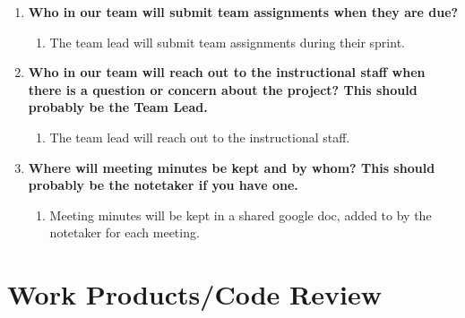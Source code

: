 \documentclass[12pt]{article}
\begin{document}
\begin{enumerate}
    \item \textbf{Who in our team will submit team assignments when they are due?}
    \begin{enumerate}
        \item The team lead will submit team assignments during their sprint.
    \end{enumerate}

    \item \textbf{Who in our team will reach out to the instructional staff when there is a question or concern about the project? This should probably be the Team Lead.}
    \begin{enumerate}
        \item The team lead will reach out to the instructional staff.
    \end{enumerate}

    \item \textbf{Where will meeting minutes be kept and by whom? This should probably be the notetaker if you have one.}
    \begin{enumerate}
        \item Meeting minutes will be kept in a shared google doc, added to by the notetaker for each meeting.
    \end{enumerate}
\end{enumerate}

\section{Work Products/Code Review}
\end{document}
